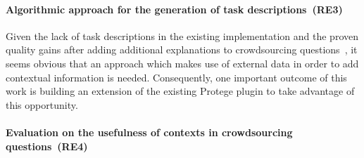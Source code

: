 \documentclass[12pt, notitlepage]{article}
\begin{document}
\paragraph{Algorithmic approach for the generation of task descriptions~(RE3)~}
Given the lack of task descriptions in the existing implementation and the proven quality gains after adding additional explanations to crowdsourcing questions~\cite{mortensen2013developing}, it seems obvious that an approach which makes use of external data in order to add contextual information is needed. Consequently, one important outcome of this work is building an extension of the existing Protege plugin to take advantage of this opportunity.


\paragraph{Evaluation on the usefulness of contexts in crowdsourcing questions~(RE4)}~


\end{document}
